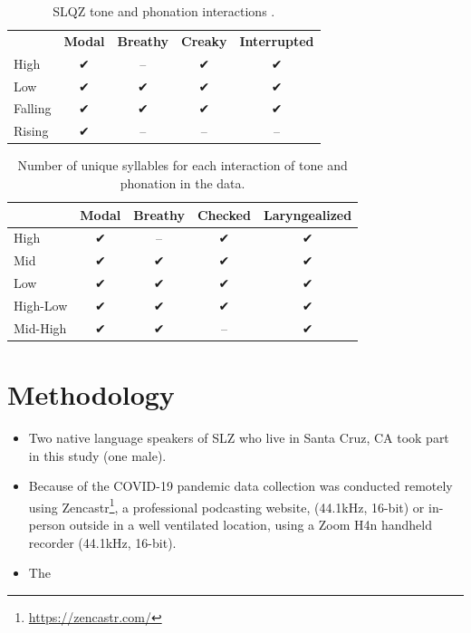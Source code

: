 \documentclass[12pt, letterpaper]{article}
\providecommand{\lsptoprule}{\midrule\toprule}
\providecommand{\lspbottomrule}{\bottomrule\midrule}
\begin{document}
\begin{table}[!ht]
	\centering
	\caption{SLQZ tone and phonation interactions \citep{chavez-peonInteractionMetricalStructure2010}.}
	\label{tab:SLQZ}
	 \begin{tabular}{lcccc}
	  \lsptoprule
					  &	 \textbf{Modal}  & \textbf{Breathy} & \textbf{Creaky} & \textbf{Interrupted} \\
		  High	& ✔︎ & -- & ✔︎ & ✔︎ \\
		  Low & ✔︎ & ✔︎ & ✔︎ & ✔︎ \\
		  Falling & ✔︎ & ✔︎ & ✔︎ & ✔︎ \\
		  Rising & ✔︎ & -- & -- & -- \\
	  \lspbottomrule
	 \end{tabular}
\end{table}

\begin{table}[!h]
	\caption{Number of unique syllables for each interaction of tone and phonation in the data.}
	\label{tab:ToneVoiceQuality}
	\centering

	\begin{tabular}{lcccc}
	\lsptoprule
		& \textbf{Modal} & \textbf{Breathy} & \textbf{Checked} & \textbf{Laryngealized} \\
	\hline
	High		& ✔︎ & -- & ✔︎ & ✔︎ \\
	Mid			& ✔︎ & ✔︎  & ✔︎ & ✔︎ \\
	Low			& ✔︎ & ✔︎  & ✔︎ & ✔︎ \\
	High-Low	& ✔︎ & ✔︎  & ✔︎ & ✔︎ \\
	Mid-High	& ✔︎ & ✔︎  & --	& ✔︎ \\
	\lspbottomrule
	\end{tabular}
\end{table}


\section{Methodology} \label{sec:Methods}

\begin{itemize}
	\item Two native language speakers of SLZ who live in Santa Cruz, CA took part in this study (one male). 
	\item Because of the COVID-19 pandemic data collection was conducted remotely using Zencastr\footnote{\href{https://zencastr.com/}{https://zencastr.com/}}, a professional podcasting website, (44.1kHz, 16-bit) or in-person outside in a well ventilated location, using a Zoom H4n handheld recorder (44.1kHz, 16-bit).
	\item The 
\end{itemize}
\end{document}

